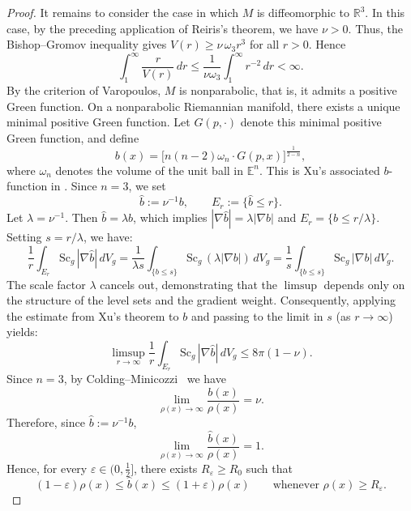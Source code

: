 \documentclass[12pt,oneside,a4paper]{article}
\theoremstyle{mytheorem}
\theoremstyle{remark}
\begin{document}
\begin{proof}
It remains to consider the case in which $M$ is diffeomorphic to $\mathbb R^3$. In this case, by the preceding application of Reiris's theorem, we have $\nu>0$.
Thus,  the Bishop--Gromov inequality gives $V(r)\ge \nu\,\omega_3 r^3$ for all $r>0.$ Hence
\[
\int_1^\infty \frac{r}{V(r)}\,dr
\le
\frac{1}{\nu\omega_3}\int_1^\infty r^{-2}\,dr<\infty.
\]
By the criterion of Varopoulos, \(M\) is nonparabolic, that is, it admits a positive Green function. On a nonparabolic Riemannian manifold, there exists a unique minimal positive Green function. Let \(G(p,\cdot)\) denote this minimal positive Green function, and define
\[
b(x) = \bigl[n(n-2)\omega_n \cdot G(p,x)\bigr]^{\frac{1}{2-n}},
\]
where \(\omega_n\) denotes the volume of the unit ball in \(\mathbb{E}^n\). This is Xu’s associated \(b\)-function in  \cite{zbMATH07177335}. Since \(n=3\), we set
\[
\widehat{b} := \nu^{-1} b, \qquad E_r := \{\widehat{b} \le r\}.
\] 
 Let $\lambda = \nu^{-1}$. Then $\widehat{b} = \lambda b$, which implies $|\nabla \widehat{b}| = \lambda |\nabla b|$ and $E_r = \{b \le r/\lambda\}$. Setting $s = r/\lambda$, we have:$$\frac{1}{r} \int_{E_r} \mathrm{Sc}_g \, |\nabla \widehat{b}| \, dV_g = \frac{1}{\lambda s} \int_{\{b \le s\}} \mathrm{Sc}_g \, (\lambda |\nabla b|) \, dV_g = \frac{1}{s} \int_{\{b \le s\}} \mathrm{Sc}_g \, |\nabla b| \, dV_g.$$The scale factor $\lambda$ cancels out, demonstrating that the $\limsup$ depends only on the structure of the level sets and the gradient weight. Consequently, applying the estimate from Xu's theorem  \cite[Theorem~1.2]{zbMATH07177335} to $b$ and passing to the limit in $s$ (as $r \to \infty$) yields:
\begin{equation}\label{Xu}
\limsup_{r \to \infty} \frac{1}{r} \int_{E_r} \mathrm{Sc}_g \, |\nabla \widehat{b}| \, dV_g \le 8\pi(1-\nu).
\end{equation}
Since \(n=3\), by Colding--Minicozzi~\cite[Lemma~2.1]{zbMATH07177335} we have
\[
\lim_{\rho(x)\to\infty}\frac{b(x)}{\rho(x)}=\nu.
\]
Therefore, since \(\widehat{b} := \nu^{-1} b\),
\[
\lim_{\rho(x)\to\infty}\frac{\widehat{b}(x)}{\rho(x)} = 1.
\]
 Hence, for every $\varepsilon\in(0,\tfrac12]$, there exists
$R_\varepsilon\ge R_0$ such that
\begin{equation}\label{eplislon }
(1-\varepsilon)\rho(x)\le \widehat b(x)\le (1+\varepsilon)\rho(x)
\qquad\text{whenever }\rho(x)\ge R_\varepsilon.
\end{equation}


\end{proof}
\end{document}
